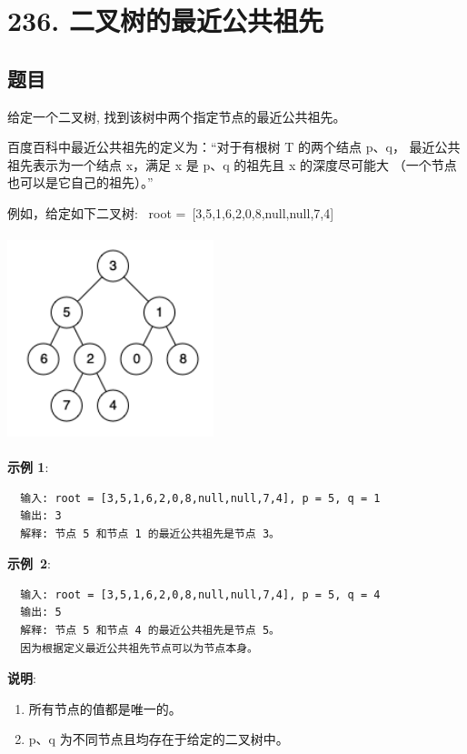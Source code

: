 \newpage
\section{236. 二叉树的最近公共祖先}
\label{leetcode:236}

\subsection{题目}

给定一个二叉树, 找到该树中两个指定节点的最近公共祖先。

百度百科中最近公共祖先的定义为：``对于有根树 T 的两个结点 p、q，
最近公共祖先表示为一个结点 x，满足 x 是 p、q 的祖先且 x 的深度尽可能大
（一个节点也可以是它自己的祖先）。''

例如，给定如下二叉树:  root = [3,5,1,6,2,0,8,null,null,7,4]

\includegraphics[width=60mm,height=60mm]{images/leetcode/leetcode_236_binarytree.png}

\textbf{示例 1}:

\begin{verbatim}
  输入: root = [3,5,1,6,2,0,8,null,null,7,4], p = 5, q = 1
  输出: 3
  解释: 节点 5 和节点 1 的最近公共祖先是节点 3。
\end{verbatim}

\textbf{示例 2}:

\begin{verbatim}
  输入: root = [3,5,1,6,2,0,8,null,null,7,4], p = 5, q = 4
  输出: 5
  解释: 节点 5 和节点 4 的最近公共祖先是节点 5。
  因为根据定义最近公共祖先节点可以为节点本身。
\end{verbatim}

\textbf{说明}:

\begin{enumerate}
  \item 所有节点的值都是唯一的。
  \item p、q 为不同节点且均存在于给定的二叉树中。
\end{enumerate}

